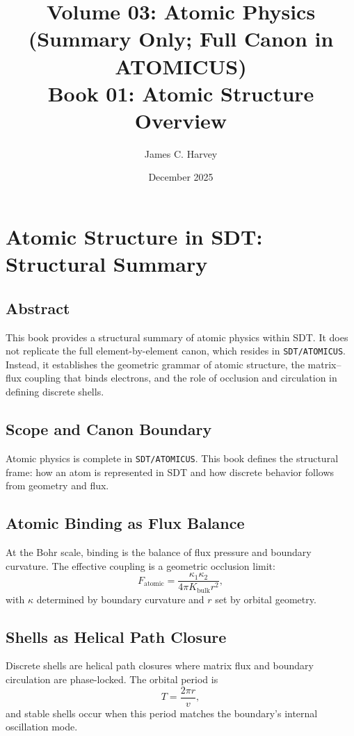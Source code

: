 \documentclass[12pt]{book}
\title{Volume 03: Atomic Physics (Summary Only; Full Canon in ATOMICUS) \\ Book 01: Atomic Structure Overview}
\author{James C. Harvey}
\date{December 2025}
\begin{document}
\maketitle
\tableofcontents

\chapter{Atomic Structure in SDT: Structural Summary}

\section*{Abstract}
This book provides a structural summary of atomic physics within SDT. It does not replicate the full
element-by-element canon, which resides in \texttt{SDT/ATOMICUS}. Instead, it establishes the geometric
grammar of atomic structure, the matrix--flux coupling that binds electrons, and the role of occlusion
and circulation in defining discrete shells.

\section{Scope and Canon Boundary}
Atomic physics is complete in \texttt{SDT/ATOMICUS}. This book defines the structural frame: how an atom
is represented in SDT and how discrete behavior follows from geometry and flux.

\section{Atomic Binding as Flux Balance}
At the Bohr scale, binding is the balance of flux pressure and boundary curvature. The effective coupling
is a geometric occlusion limit:
\begin{equation}
F_{\text{atomic}} = \frac{\kappa_1 \kappa_2}{4\pi K_{\text{bulk}} r^2},
\end{equation}
with $\kappa$ determined by boundary curvature and $r$ set by orbital geometry.

\section{Shells as Helical Path Closure}
Discrete shells are helical path closures where matrix flux and boundary circulation are phase-locked.
The orbital period is
\begin{equation}
T = \frac{2\pi r}{v},
\end{equation}
and stable shells occur when this period matches the boundary’s internal oscillation mode.
\end{document}
